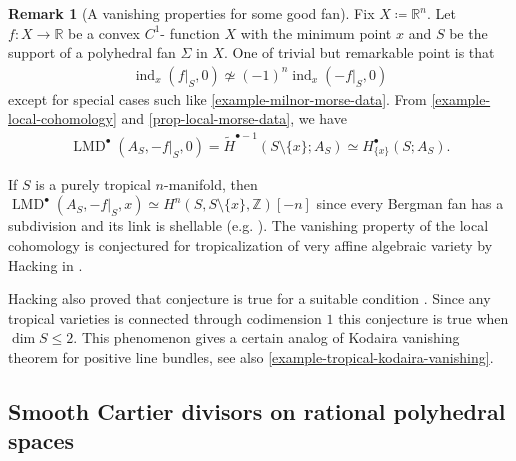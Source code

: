\documentclass[a4paper,dvipdfmx,reqno,12pt]{amsart}
\theoremstyle{definition}
\newtheorem{remark}[theorem]{Remark}
\newcommand{\deq}{\coloneqq}
\newcommand{\mcal}[1]{\mathcal{#1}}%
\newcommand{\opn}[1]{\operatorname{#1}}
\numberwithin{equation}{section}
\begin{document}




\begin{remark}[{A vanishing properties
for some good fan}]
Fix $X\deq \mathbb{R}^{n}$.
Let $f\colon X\to {\mathbb{R}}$ be a convex $C^{1}$-
function $X$ with the minimum point $x$
and $S$ be the support of 
a polyhedral fan $\Sigma$ in $X$.
One of trivial but remarkable point is that
\begin{align}
\opn{ind}_x(f|_S,0)\not\simeq (-1)^{n}
\opn{ind}_x(-f|_S,0)
\end{align}
except for special cases such like
\cref{example-milnor-morse-data}.
From \cref{example-local-cohomology} and
\cref{prop-local-morse-data}, we have
\begin{align}
\opn{LMD}^{\bullet}(A_S,-f|_S,0)=
\tilde{H}^{\bullet-1}(S\setminus \{x\};A_{S})
\simeq H^{\bullet}_{\{x\}}(S;A_S).
\end{align}



If $S$ is a purely tropical $n$-manifold, then 
$\opn{LMD}^{\bullet}(A_S,-f|_S,x)\simeq H^{n}(S,S\setminus\{x\},
\mathbb{Z})[-n]$ since every Bergman fan has a subdivision 
\cite[Theorem 1]{MR2185977} and its link is shellable
(e.g. \cite[7.9.1. Theorem]{MR1165544}).
The vanishing property of the local cohomology is conjectured for
tropicalization of very affine algebraic variety by Hacking in
\cite{MR2452307}.

Hacking also proved that conjecture is true for a suitable condition
\cite[Theorem 2.5]{MR2452307}.
Since any tropical varieties is connected
through codimension $1$ \cite[Theorem 3.3.5]{MR3287221}
this conjecture is true when $\dim S \leq 2$.
This phenomenon gives a certain analog of Kodaira vanishing theorem for 
positive line bundles, see 
also \cref{example-tropical-kodaira-vanishing}.
\end{remark}

\subsection{Smooth Cartier divisors on rational 
polyhedral spaces}
\end{document}
